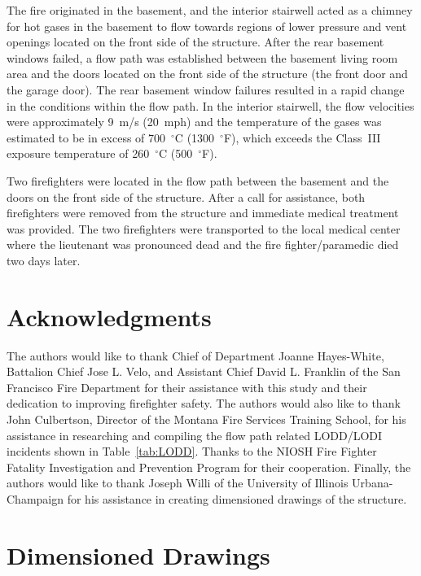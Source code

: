 \documentclass[12pt,oneside]{book}
\begin{document}
The fire originated in the basement, and the interior stairwell acted as a chimney for hot gases in the basement to flow towards regions of lower pressure and vent openings located on the front side of the structure. After the rear basement windows failed, a flow path was established between the basement living room area and the doors located on the front side of the structure (the front door and the garage door). The rear basement window failures resulted in a rapid change in the conditions within the flow path. In the interior stairwell, the flow velocities were approximately 9~m/s (20~mph) and the temperature of the gases was estimated to be in excess of 700~$^{\circ}$C (1300~$^{\circ}$F), which exceeds the Class~III exposure temperature of 260~$^{\circ}$C (500~$^{\circ}$F).

Two firefighters were located in the flow path between the basement and the doors on the front side of the structure. After a call for assistance, both firefighters were removed from the structure and immediate medical treatment was provided. The two firefighters were transported to the local medical center where the lieutenant was pronounced dead and the fire fighter/paramedic died two days later.


\chapter*{Acknowledgments}

The authors would like to thank Chief of Department Joanne Hayes-White, Battalion Chief Jose L. Velo, and Assistant Chief David L. Franklin of the San Francisco Fire Department for their assistance with this study and their dedication to improving firefighter safety. The authors would also like to thank John Culbertson, Director of the Montana Fire Services Training School, for his assistance in researching and compiling the flow path related LODD/LODI incidents shown in Table~\ref{tab:LODD}. Thanks to the NIOSH Fire Fighter Fatality Investigation and Prevention Program for their cooperation. Finally, the authors would like to thank Joseph Willi of the University of Illinois Urbana-Champaign for his assistance in creating dimensioned drawings of the structure.



\appendix

\chapter{Dimensioned Drawings}
\label{sec:drawings}
\end{document}

